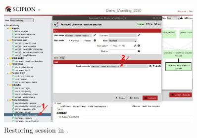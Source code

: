  \begin{figure}[H]
  \centering 
  \captionsetup{width=.7\linewidth} 
  \includegraphics[width=0.90\textwidth]{Images/Fig17}
  \caption{Restoring session in \chimera.}
  \label{fig:restore_session_protocol}
  \end{figure}
